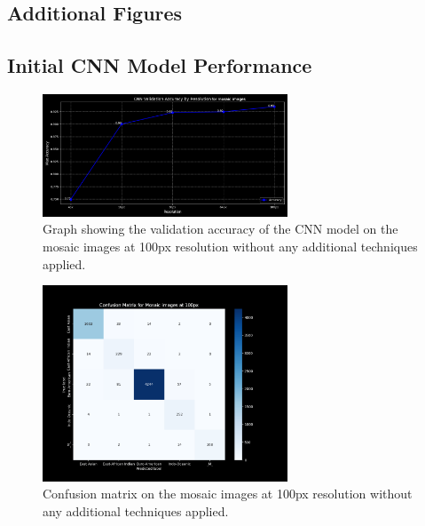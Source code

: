 \begin{appendices}

	\chapter{Additional Figures}
	\label{app:additional_figures}

	\section{Initial CNN Model Performance}
	\label{app:initial_cnn_performance}

	\begin{figure}[H]
		\centering
		\includegraphics[width=0.65\textwidth]{../imgs/graphs/cnn_validation_accuracy_mosaics_line.png}
		\caption{Graph showing the validation accuracy of the CNN model on the mosaic images at 100px resolution without any
			additional techniques applied.}
		\label{fig:initial_accuracy_mosaic}
	\end{figure}

	\begin{figure}[H]
		\centering
		\includegraphics[width=0.65\textwidth]{../imgs/graphs/cnn_confusion_matrix_mosaics_100px.png}
		\caption{Confusion matrix on the mosaic images at 100px resolution without any additional techniques applied.}
		\label{fig:initial_confusion_matrix_mosaic}
	\end{figure}


\end{appendices}
